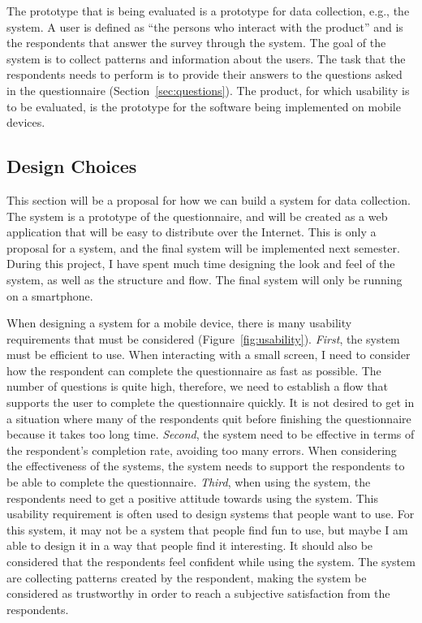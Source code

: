   The prototype that is being evaluated is a prototype for data collection, e.g., the system. A user is defined as ``the persons who interact with the product'' and is the respondents that answer the survey through the system. The goal of the system is to collect patterns and information about the users. The task that the respondents needs to perform is to provide their answers to the questions asked in the questionnaire (Section~\ref{sec:questions}). The product, for which usability is to be evaluated, is the prototype for the software being implemented on mobile devices.  

  \subsection{Design Choices} \label{sec:designChoices}
    
  This section will be a proposal for how we can build a system for data collection. The system is a prototype of the questionnaire, and will be created as a web application that will be easy to distribute over the Internet. This is only a proposal for a system, and the final system will be implemented next semester. During this project, I have spent much time designing the look and feel of the system, as well as the structure and flow. The final system will only be running on a smartphone.

  When designing a system for a mobile device, there is many usability requirements that must be considered (Figure~\ref{fig:usability}). {\it First}, the system must be efficient to use. When interacting with a small screen, I need to consider how the respondent can complete the questionnaire as fast as possible. The number of questions is quite high, therefore, we need to establish a flow that supports the user to complete the questionnaire quickly. It is not desired to get in a situation where many of the respondents quit before finishing the questionnaire because it takes too long time. {\it Second}, the system need to be effective in terms of the respondent's completion rate, avoiding too many errors. When considering the effectiveness of the systems, the system needs to support the respondents to be able to complete the questionnaire. {\it Third}, when using the system, the respondents need to get a positive attitude towards using the system. This usability requirement is often used to design systems that people want to use. For this system, it may not be a system that people find fun to use, but maybe I am able to design it in a way that people find it interesting. It should also be considered that the respondents feel confident while using the system. The system are collecting patterns created by the respondent, making the system be considered as trustworthy in order to reach a subjective satisfaction from the respondents.

